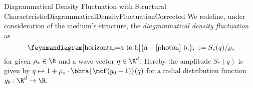 \begin{mdef}{Diagrammatical Density Fluctuation with Structural Characteristic}{DiagrammaticalDensityFluctuationCorrected}
    We redefine, under consideration of the medium's structure, the \emph{diagrammatical density fluctuation} as  
    \[
        \vcenter{\hbox{
            \feynmandiagram[horizontal=a to b]{a -- [photon] b;};
        }}    
        := S_*(q)/\rho_*
    \]
    for given $\rho_*\in\R$ and a wave vector $q\in\R^d$. Hereby the amplitude $S_*(q)$ is given by $q\mapsto 1 + \rho_*\cdot\bbra{\mcF (g_0 - 1)}(q)$ for a radial distribution function $g_0:\R^d\to\R$. 
\end{mdef}